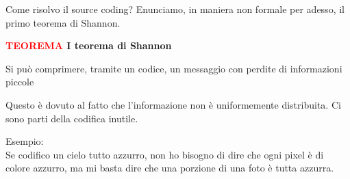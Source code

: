 \documentclass{article}
\begin{document}
    \noindent Come risolvo il source coding? Enunciamo, in maniera non formale per adesso, il primo teorema di Shannon.
    \vspace{5px}
    \begin{tcolorbox}
        \textbf{\textcolor{red}{TEOREMA} I teorema di Shannon}
        \vspace{5px}
        \begin{center}
            Si può comprimere, tramite un codice, un messaggio con perdite di informazioni piccole
        \end{center}
    \end{tcolorbox}
    \vspace{5px}
    \noindent Questo è dovuto al fatto che l'informazione non è uniformemente distribuita. Ci sono parti della codifica inutile.\\
    \vspace{5px}

    \noindent Esempio:\\
    Se codifico un cielo tutto azzurro, non ho bisogno di dire che ogni pixel è di colore azzurro, ma mi basta dire che una porzione di una foto è tutta azzurra.
\end{document}
